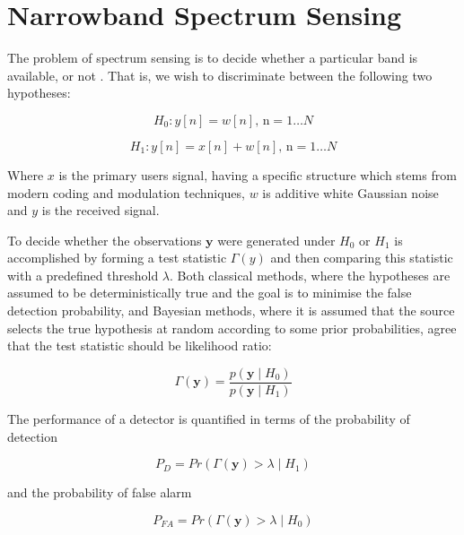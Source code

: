 \section{Narrowband Spectrum Sensing}

The problem of spectrum sensing is to decide whether a particular band is available, or not \cite{Y}. That is, we wish to discriminate between the following two hypotheses:

\begin{equation}
H_{0}: y\left[n\right] = w\left[n\right] \text{, n} =  1 \ldots N 
\end{equation}
\label{h1}

\begin{equation}
H_{1}: y\left[n \right] = x\left[n\right] + w\left[n\right] \text{, n} =  1 \ldots N 
\end{equation}
\label{h2}

Where \(x\) is the primary users signal, having a specific structure which stems from modern coding and modulation techniques, \(w\) is additive white Gaussian noise and \(y\) is the received signal.

To decide whether the observations \(\textbf{y}\) were generated under \(\textit{H}_{0}\) or \(\textit{H}_{1}\) is accomplished by forming a test statistic \(\Gamma\left(y\right)\) and then comparing this statistic with a predefined threshold \(\lambda\). Both classical methods, where the hypotheses are assumed to be deterministically true and the goal is to minimise the false detection probability, and Bayesian methods, where it is assumed that the source selects the true hypothesis at random according to some prior probabilities, agree that the test statistic should be likelihood ratio:

\begin{equation}
\Gamma\left(\textbf{y}\right) = \frac{p\left(\textbf{y}\mid H_0\right)}{p\left(\textbf{y}\mid H_1\right)}
\end{equation}

The performance of a detector is quantified in terms of the probability of detection

\begin{equation}
P_{D} = Pr\left( \Gamma\left(\textbf{y}\right) > \lambda \mid H_1\right)
\end{equation}

and the probability of false alarm 

\begin{equation}
P_{FA} = Pr\left( \Gamma\left(\textbf{y}\right) > \lambda \mid H_0\right)
\end{equation}

